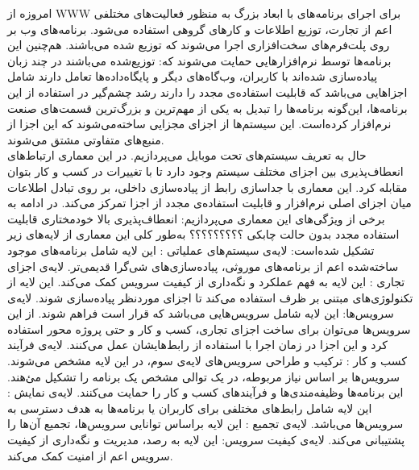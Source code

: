 امروزه از WWW برای اجرای برنامه‌های با ابعاد بزرگ به منظور فعالیت‌های مختلفی اعم از تجارت، توزیع اطلاعات و کارهای گروهی استفاده می‌شود. برنامه‌های وب بر روی پلت‌فرم‌‌های سخت‌افزاری اجرا می‌شوند که توزیع شده می‌باشند. هم‌چنین این برنامه‌ها توسط نرم‌افزار‌هایی حمایت می‌شوند که:
 توزیع‌شده می‌باشند
 در چند زبان پیاده‌سازی شده‌اند
 با کاربران، وب‌گاه‌های دیگر و پایگاه‌داده‌ها تعامل دارند
 شامل اجزاهایی می‌باشد که قابلیت استفاده‌ی مجدد را دارند
رشد چشم‌گیر در استفاده از این برنامه‌ها، این‌گونه برنامه‌ها را تبدیل به یکی از مهم‌ترین‌ و بزرگ‌ترین قسمت‌های صنعت نرم‌افزار کرده‌است. این سیستم‌ها از اجزای مجزایی ساخته‌می‌شوند که این اجزا از منبع‌های متفاوتی مشتق می‌شوند.  
\\
حال به تعریف سیستم‌های تحت موبایل می‌پردازیم.
در این معماری ارتباط‌های انعطاف‌پذیری بین اجزای مختلف سیستم وجود دارد تا با تغییرات در کسب و کار بتوان مقابله کرد. این معماری با جداسازی رابط از پیاده‌سازی داخلی، بر روی تبادل اطلاعات میان اجزای اصلی نرم‌افزار و قابلیت استفاده‌ی مجدد از اجزا تمرکز می‌کند. در ادامه به برخی از ویژگی‌های این معماری می‌پردازیم:
 انعطاف‌پذیری بالا
 خودمختاری 
 قابلیت استفاده مجدد
 بدون حالت 
 چابکی  
 ؟؟؟؟؟؟؟؟؟
به‌طور کلی این معماری از لایه‌های زیر تشکیل شده‌است:
 لایه‌ی سیستم‌های عملیاتی : این لایه شامل برنامه‌های موجود ساخته‌شده اعم از برنامه‌های موروثی، پیاده‌سازی‌های شی‌گرا قدیمی‌تر.
 لایه‌ی اجزای تجاری : این لایه به فهم عملکرد و نگه‌داری از کیفیت سرویس  کمک می‌کند. این لایه از تکنولوژی‌های مبتنی بر ظرف استفاده می‌کند تا اجزای موردنظر پیاده‌سازی شوند.
 لایه‌ی سرویس‌ها: این لایه شامل سرویس‌هایی می‌باشد که قرار است فراهم شوند. از این سرویس‌ها می‌توان برای ساخت اجزای تجاری، کسب و کار و حتی پروژه محور استفاده کرد و این اجزا در زمان اجرا با استفاده از رابط‌هایشان عمل می‌کنند.
 لایه‌ی فرآیند کسب و کار : ترکیب و طراحی سرویس‌های لایه‌ی سوم، در این لایه مشخص می‌شوند. سرویس‌ها بر اساس نیاز مربوطه، در یک توالی مشخص یک برنامه را تشکیل می‌ٔهند. این برنامه‌ها وظیفه‌مندی‌ها و فرآیندهای کسب و کار را حمایت می‌کنند.
 لایه‌ی نمایش  : این لایه شامل رابط‌های مختلفی برای کاربران یا برنامه‌ها به هدف دسترسی به سرویس‌ها می‌باشد.
 لایه‌ی تجمیع : این لایه براساس توانایی سرویس‌ها، تجمیع آن‌ها را پشتیبانی می‌کند.
 لایه‌ی کیفیت سرویس: این لایه به رصد، مدیریت و نگه‌داری از کیفیت سرویس اعم از امنیت کمک می‌کند. 






